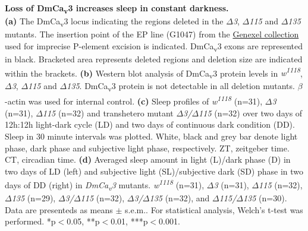 \label{fig:S2}
\textbf{Loss of DmCa\textsubscript{v}3 increases sleep in constant darkness.}
\\
\textbf{(a)} The DmCa\textsubscript{v}3 locus indicating the regions deleted in the \emph{$\Delta$3}, \emph{$\Delta$115} and \emph{$\Delta$135} mutants.
The insertion point of the EP line (G1047) from the \href{http://genexel.kaist.ac.kr}{Genexel collection} used for imprecise P-element excision is indicated.
DmCa\textsubscript{v}3 exons are represented in black.
Bracketed area represents deleted regions and deletion size are indicated within the brackets.
\textbf{(b)} Western blot analysis of DmCa\textsubscript{v}3 protein levels in \emph{w\textsuperscript{1118}}, \emph{$\Delta$3}, \emph{$\Delta$115} and \emph{$\Delta$135}.
DmCa\textsubscript{v}3 protein is not detectable in all deletion mutants.
$\beta$-actin was used for internal control.
\textbf{(c)} Sleep profiles of \emph{w\textsuperscript{1118}} (n=31), \emph{$\Delta$3} (n=31), \emph{$\Delta$115} (n=32) and transhetero mutant \emph{$\Delta$3/$\Delta$115} (n=32) over two days of 12h:12h light-dark cycle (LD) and two days of continuous dark condition (DD).
Sleep in 30 minute intervals was plotted.
White, black and grey bar denote light phase, dark phase and subjective light phase, respectively.
ZT, zeitgeber time.
CT, circadian time.
\textbf{(d)} Averaged sleep amount in light (L)/dark phase (D) in two days of LD (left) and subjective light (SL)/subjective dark (SD) phase in two days of DD (right) in \emph{DmCa\textsubscript{v}3} mutants.
\emph{w\textsuperscript{1118}} (n=31), \emph{$\Delta$3} (n=31), \emph{$\Delta$115} (n=32), \emph{$\Delta$135} (n=29), \emph{$\Delta$3/$\Delta$115} (n=32), \emph{$\Delta$3/$\Delta$135} (n=32), and \emph{$\Delta$115/$\Delta$135} (n=30).
Data are presenteds as means $\pm$ s.e.m..
For statistical analysis, Welch's t-test was performed.
*p$<$0.05, **p$<$0.01, ***p$<$0.001.
  
  
  